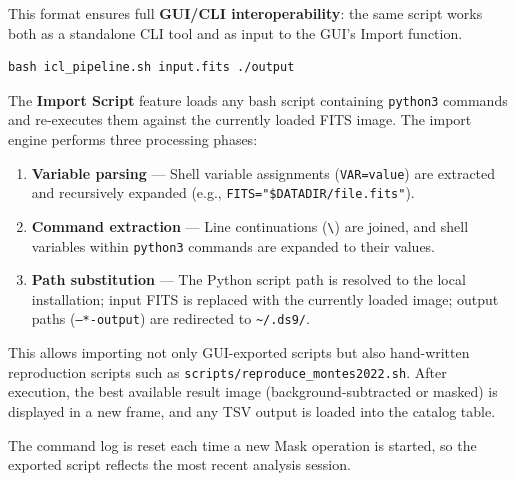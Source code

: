 \documentclass[11pt,fleqn]{book}
\begin{document}
\noindent This format ensures full \textbf{GUI/CLI interoperability}: the same script works both as a standalone CLI tool and as input to the GUI's Import function.

\begin{codebox}
\begin{lstlisting}[style=bash,numbers=none]
bash icl_pipeline.sh input.fits ./output
\end{lstlisting}
\end{codebox}

\noindent The \textbf{Import Script} feature loads any bash script containing \texttt{python3} commands and re-executes them against the currently loaded FITS image.  The import engine performs three processing phases:

\begin{enumerate}
  \item \textbf{Variable parsing} --- Shell variable assignments (\texttt{VAR=value}) are extracted and recursively expanded (e.g., \texttt{FITS="\$DATADIR/file.fits"}).
  \item \textbf{Command extraction} --- Line continuations (\texttt{\textbackslash}) are joined, and shell variables within \texttt{python3} commands are expanded to their values.
  \item \textbf{Path substitution} --- The Python script path is resolved to the local installation; input FITS is replaced with the currently loaded image; output paths (\texttt{--*-output}) are redirected to \texttt{\textasciitilde/.ds9/}.
\end{enumerate}

\noindent This allows importing not only GUI-exported scripts but also hand-written reproduction scripts such as \texttt{scripts/reproduce\_montes2022.sh}.  After execution, the best available result image (background-subtracted or masked) is displayed in a new frame, and any TSV output is loaded into the catalog table.

\begin{important}
The command log is reset each time a new Mask operation is started, so the exported script reflects the most recent analysis session.
\end{important}
\end{document}
